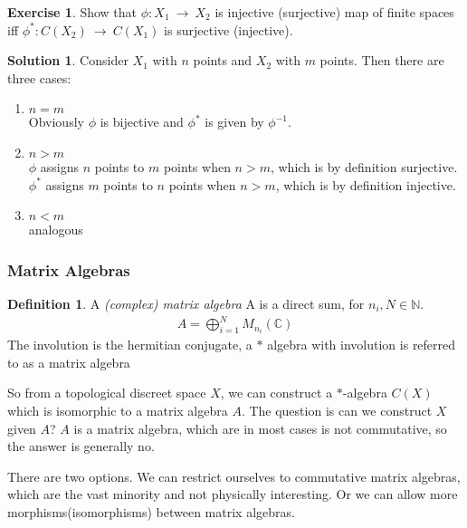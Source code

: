 \documentclass[a4paper]{article}
\theoremstyle{definition}
\newtheorem{definition}{Definition}
\theoremstyle{definition}
\theoremstyle{theorem}
\theoremstyle{theorem}
\newtheorem{exercise}{Exercise}
\theoremstyle{definition}
\newtheorem{solution}{Solution}
\begin{document}
\begin{exercise}
    Show that $\phi :X_1\ \rightarrow \ X_2$ is injective (surjective) map of finite spaces iff
    $\phi ^* :C(X_2)\ \rightarrow \ C(X_1)$ is surjective (injective).
\end{exercise}
\begin{solution}
    Consider $X_1$ with $n$ points and $X_2$ with $m$ points. Then there are three cases:
    \begin{enumerate}
        \item $n=m$ \\
            Obviously $\phi$ is bijective and $\phi ^*$ is given by $\phi ^{-1}$.
        \item $n > m$ \\
            $\phi$ assigns $n$ points to $m$ points when $n > m$,
            which is by definition surjective. \\
            $\phi ^*$ assigns $m$ points to $n$ points when $n > m$,
            which is by definition injective. \\
        \item $n < m $ \\
            analogous
    \end{enumerate}
\end{solution}

\subsubsection{Matrix Algebras}
\begin{definition}
    A \textit{(complex) matrix algebra} A is a direct sum, for $n_i, N \in \mathbb{N}$.
    \begin{align*}
        A = \bigoplus _{i=1}^{N} M_{n_i}(\mathbb{C})
    \end{align*}
    The involution is the hermitian conjugate, a $*$ algebra with involution is referred to as
    a matrix algebra
\end{definition}

So from a topological discreet space $X$, we can construct a $*$-algebra $C(X)$ which is isomorphic
to a matrix algebra $A$. The question is can we construct $X$ given $A$? $A$ is a matrix algebra,
which are in most cases is not commutative, so the answer is generally no.

There are two options. We can restrict ourselves to commutative matrix algebras,
which are the vast minority and not physically interesting.
Or we can allow more morphisms(isomorphisms) between matrix algebras.
\end{document}

